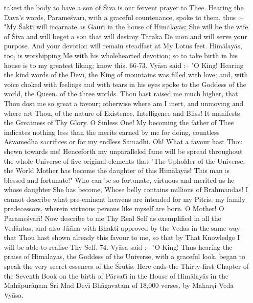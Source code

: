 takest the body to have a son of \'Siva is our fervent prayer to Thee. Hearing the Dava's words, Parame\'svar\={\i}, with a graceful countenance, spoke to them, thus :-- "My \'Sakt\={\i} will incarnate as Gaur\={\i} in the house of Him\=alay\=as; She will be the wife of \'Siva and will beget a son that will destroy T\=araka De
mon and will serve your purpose. And your devotion will remain steadfast at My Lotus feet. Him\=alay\=as, too, is worshipping Me with his wholehearted devotion; so to take birth in his house is to my greatest liking; know this.
66-73. Vy\=asa said :-- "O King! Hearing the kind words of the Dev\={\i}, the King of mountains was filled with love; and, with voice choked with feelings and with tears in his eyes spoke to the Goddess of the world, the Queen. of the three worlds. Thou hast raised me much higher, that Thou dost me so great a favour; otherwise where am I inert, and unmoving and where art Thou, of the nature of Existence, Intelligence and Bliss! It manifests the Greatness of Thy Glory. O Sinless One! My becoming the father of Thee indicates nothing less than the merits earned by me for doing, countless A\'svamedha sacrifices or for my endless Sam\=adhi. Oh! What a favour hast Thou shewn towards me! Henceforth my unparalleled fame will be spread throughout the whole Universe of five original elements that "The Upholder of the Universe, the World Mother has become the daughter of this Him\=alay\=as! This man is blessed and fortunate!" Who can be so fortunate, virtuous and merited as he whose daughter She has become, Whose belly contains millions of Brahm\=andas! I cannot describe what pre-eminent heavens are intended for my Pitris, my family predecessors, wherein virtuous persons like myself are born. O Mother! O Parame\'svar\={\i}! Now describe to me Thy Real Self as exemplified in all the Ved\=antas; and also J\~n\=ana with Bhakti approved by the Vedas in the same way that Thou hast shown already this favour to me, so that by That Knowledge I will be able to realise Thy Self.
74. Vy\=asa said :-- "O King! Thus hearing the praise of Him\=alayas, the Goddess of the Universe, with a graceful look, began to speak the very secret essences of the \'Srutis.
Here ends the Thirty-first Chapter of the Seventh Book on the birth of P\=arvat\={\i} in the House of Him\=alay\=as in the Mah\=apur\=a\d{n}am \'Sri Mad Dev\={\i} Bh\=agavatam of 18,000 verses, by Mahar\d{s}i Veda Vy\=asa.



